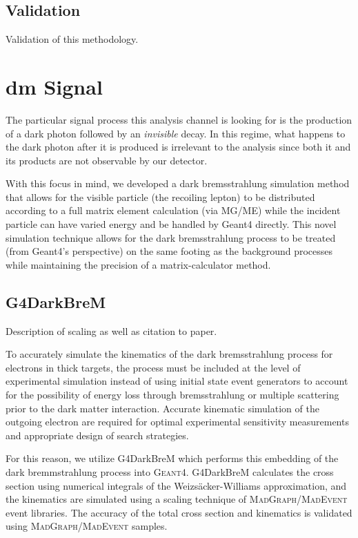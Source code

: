 \subsection{Validation}
\begin{todoenv}Validation of this methodology.\end{todoenv}

\section{\ac{dm} Signal}
The particular signal process this analysis channel is looking for is the
production of a dark photon followed by an \emph{invisible} decay. In this
regime, what happens to the dark photon after it is produced is irrelevant
to the analysis since both it and its products are not observable by our
detector.

With this focus in mind, we developed a dark bremsstrahlung simulation method
that allows for the visible particle (the recoiling lepton) to be distributed
according to a full matrix element calculation (via MG/ME) while the incident
particle can have varied energy and be handled by Geant4 directly. This novel
simulation technique allows for the dark bremsstrahlung process to be treated
(from Geant4's perspective) on the same footing as the background processes
while maintaining the precision of a matrix-calculator method.

\subsection{G4DarkBreM}
\begin{todoenv}Description of scaling as well as citation to paper.\end{todoenv}
To accurately simulate the kinematics of the dark bremsstrahlung process for electrons in thick targets, the process must be included at the level of experimental simulation instead of using initial state event generators to account for the possibility of energy loss through bremsstrahlung or multiple scattering prior to the dark matter interaction. Accurate kinematic simulation of the outgoing electron are required for optimal experimental sensitivity measurements and appropriate design of search strategies.

For this reason, we utilize G4DarkBreM \cite{g4darkbrem} which performs this embedding of the dark bremmstrahlung process into \textsc{Geant}4. G4DarkBreM calculates the cross section using numerical integrals of the Weizs\"{a}cker-Williams approximation, and the kinematics are simulated using a scaling technique of \textsc{MadGraph/MadEvent} event libraries. The accuracy of the total cross section and kinematics is validated using \textsc{MadGraph/MadEvent} samples.

